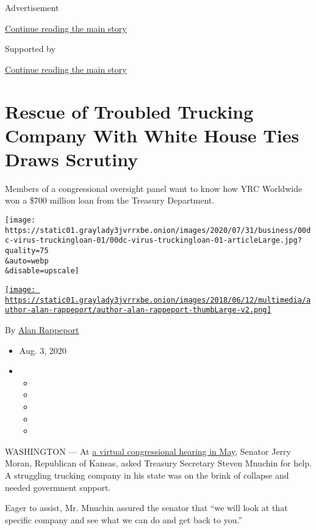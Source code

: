 Advertisement

\protect\hyperlink{after-top}{Continue reading the main story}

Supported by

\protect\hyperlink{after-sponsor}{Continue reading the main story}

\hypertarget{rescue-of-troubled-trucking-company-with-white-house-ties-draws-scrutiny}{%
\section{Rescue of Troubled Trucking Company With White House Ties Draws
Scrutiny}\label{rescue-of-troubled-trucking-company-with-white-house-ties-draws-scrutiny}}

Members of a congressional oversight panel want to know how YRC
Worldwide won a \$700 million loan from the Treasury Department.

\texttt{[image: https://static01.graylady3jvrrxbe.onion/images/2020/07/31/business/00dc-virus-truckingloan-01/00dc-virus-truckingloan-01-articleLarge.jpg?quality=75\\\&auto=webp\\\&disable=upscale]}

\href{https://www.nytimes3xbfgragh.onion/by/alan-rappeport}{\texttt{[image: https://static01.graylady3jvrrxbe.onion/images/2018/06/12/multimedia/author-alan-rappeport/author-alan-rappeport-thumbLarge-v2.png]}}

By \href{https://www.nytimes3xbfgragh.onion/by/alan-rappeport}{Alan
Rappeport}

\begin{itemize}
\item
  Aug. 3, 2020
\item
  \begin{itemize}
  \item
  \item
  \item
  \item
  \item
  \end{itemize}
\end{itemize}

WASHINGTON --- At
\href{https://www.c-span.org/video/?472163-1/fed-reserve-chair-treasury-secretary-testimony-coronavirus-relief-bill}{a
virtual congressional hearing in May}, Senator Jerry Moran, Republican
of Kansas, asked Treasury Secretary Steven Mnuchin for help. A
struggling trucking company in his state was on the brink of collapse
and needed government support.

Eager to assist, Mr. Mnuchin assured the senator that ``we will look at
that specific company and see what we can do and get back to you.''

